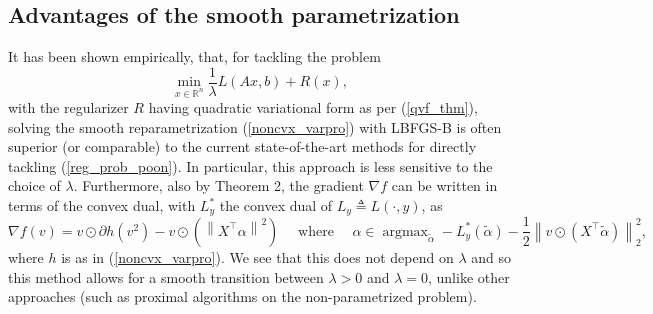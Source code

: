 \documentclass[11pt, twoside]{report}
\begin{document}

\subsection{Advantages of the smooth parametrization}
It has been shown empirically, that, for tackling the problem
\begin{equation} \label{reg_prob_poon}
    \min_{x \in \mathbb{R}^n} \frac{1}{\lambda}L(Ax,b) + R(x),
\end{equation}
with the regularizer $R$ having quadratic variational form as per (\ref{qvf_thm}), solving the smooth reparametrization (\ref{noncvx_varpro}) with LBFGS-B is often superior (or comparable) to the current state-of-the-art methods for directly tackling (\ref{reg_prob_poon}). In particular, this approach is less sensitive to the choice of $\lambda$. Furthermore, also by Theorem 2\cite{poon}, the gradient $\nabla f$ can be written in terms of the convex dual, with $L_y^*$ the convex dual of $L_y \triangleq L(\cdot,y)$, as
$$
\nabla f(v)=v \odot \partial h\left(v^2\right)-v \odot \left(\left\|X^{\top} \alpha\right\|^2\right) \quad \text { where } \quad \alpha \in \operatorname{argmax}_{\tilde{\alpha}}-L_y^*(\tilde{\alpha})-\frac{1}{2}\left\|v \odot \left(X^{\top} \tilde{\alpha}\right)\right\|_2^2,
$$
where $h$ is as in (\ref{noncvx_varpro}). We see that this does not depend on $\lambda$ and so this method allows for a smooth transition between $\lambda > 0$ and $\lambda = 0$, unlike other approaches (such as proximal algorithms on the non-parametrized problem).

\end{document}

